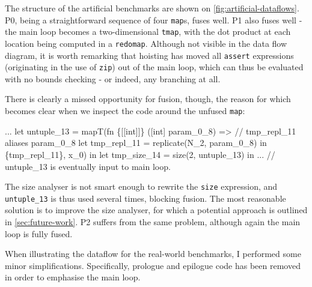 The structure of the artificial benchmarks are shown on
\cref{fig:artificial-dataflows}.  P0, being a straightforward sequence
of four \texttt{map}s, fuses well.  P1 also fuses well - the main loop
becomes a two-dimensional \texttt{tmap}, with the dot product at each
location being computed in a \texttt{redomap}.  Although not visible
in the data flow diagram, it is worth remarking that hoisting has
moved all \texttt{assert} expressions (originating in the use of
\texttt{zip}) out of the main loop, which can thus be evaluated with
no bounds checking - or indeed, any branching at all.

There is clearly a missed opportunity for fusion, though, the reason
for which becomes clear when we inspect the code around the unfused
\texttt{map}:
\begin{colorcode}
...
let {untuple_13} =
  mapT(fn \{[[int]]\} ([int] param_0_8) =>
         // tmp_repl_11 aliases param_0_8
         let tmp_repl_11 = replicate(N_2, param_0_8) in
         \{tmp_repl_11\},
       x_0) in
let tmp_size_14 = size(2, untuple_13) in
... // untuple_13 is eventually input to main loop.
\end{colorcode}
The size analyser is not smart enough to rewrite the \texttt{size}
expression, and \texttt{untuple\_13} is thus used several times,
blocking fusion.  The most reasonable solution is to improve the size
analyser, for which a potential approach is outlined in
\cref{sec:future-work}.  P2 suffers from the same problem, although
again the main loop is fully fused.

When illustrating the dataflow for the real-world benchmarks, I
performed some minor simplifications.  Specifically, prologue and
epilogue code has been removed in order to emphasise the main loop.

